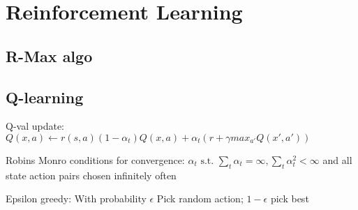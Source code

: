 \section{Reinforcement Learning}

\subsection{R-Max algo}



\subsection{Q-learning}

Q-val update: \(Q(x,a) \leftarrow r(s,a) (1-\alpha_{t})Q(x,a) + \alpha_{t} (r + \gamma max_{a'} Q(x',a')) \)

Robins Monro conditions for convergence:
\(\alpha_{t} \text{ s.t. } \sum_{t} \alpha_{t} = \infty, \sum_{t} \alpha_{t}^{2} < \infty\) and all state action pairs chosen infinitely often

Epsilon greedy: With probability \( \epsilon\) Pick random action; \(1-\epsilon\) pick best